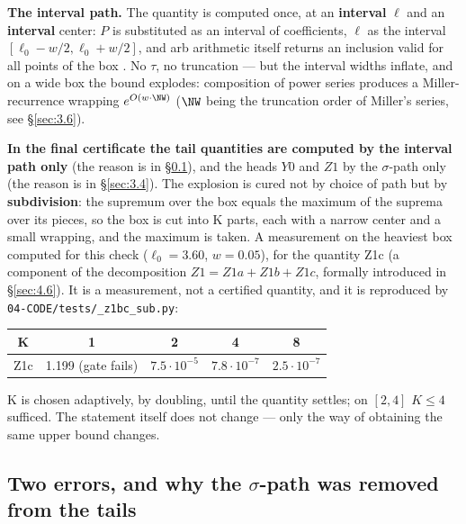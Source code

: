 \textbf{The interval path.} The quantity is computed once, at an \textbf{interval} $\ell$ and an
\textbf{interval} center: $P$ is substituted as an interval of coefficients, $\ell$ as
the interval $[\ell_0-w/2, \ell_0+w/2]$, and arb arithmetic itself returns an inclusion
valid for all points of the box \cite{moore1966interval, tucker2011validated, rump2010verification}. No $\tau$, no truncation --- but the interval widths
inflate, and on a wide box the bound explodes: composition of power series
produces a Miller-recurrence wrapping $e^{O(w \cdot \NW)}$ ($\NW$ being the truncation order
of Miller's series, see \S\ref{sec:3.6}).

\textbf{In the final certificate the tail quantities are computed by the interval path
only} (the reason is in \S\ref{sec:3.3}), and the heads $Y0$ and $Z1$ by the $\sigma$-path only
(the reason is in \S\ref{sec:3.4}). The explosion is cured not by choice of path but by
\textbf{subdivision}: the supremum over the box equals the maximum of the suprema over
its pieces, so the box is cut into K parts, each with a narrow center and a small
wrapping, and the maximum is taken. A measurement on the heaviest box computed
for this check ($\ell_0=3.60$, $w=0.05$), for the quantity Z1c (a component of the
decomposition $Z1=Z1a+Z1b+Z1c$, formally introduced in \S\ref{sec:4.6}). It is a
measurement, not a certified quantity, and it is reproduced by
\texttt{04-\allowbreak CODE/\allowbreak tests/\allowbreak \_\allowbreak z1bc\_\allowbreak sub.py}:

\begin{center}
\begin{tabular}{|c|c|c|c|c|}
\hline
K & 1 & 2 & 4 & 8 \\
\hline
Z1c & 1.199 (gate fails) & $7.5 \cdot 10^{-5}$ & $7.8 \cdot 10^{-7}$ & $2.5 \cdot 10^{-7}$ \\
\hline
\end{tabular}
\end{center}

K is chosen adaptively, by doubling, until the quantity settles; on $[2,4]$ $K \le 4$
sufficed. The statement itself does not change --- only the way of obtaining the
same upper bound changes.


\subsection{Two errors, and why the $\sigma$-path was removed from the tails}
\label{sec:3.3}


